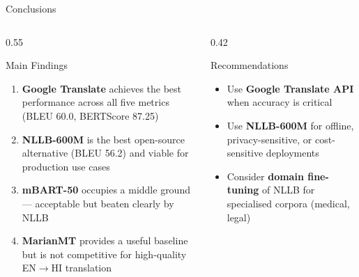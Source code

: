 \documentclass{beamer}
\begin{document}
\begin{frame}{Conclusions}
  \begin{columns}[T]
    \begin{column}{0.55\textwidth}
      \begin{block}{Main Findings}
        \begin{enumerate}
          \item \textbf{Google Translate} achieves the best performance across all five metrics (BLEU 60.0, BERTScore 87.25)
          \item \textbf{NLLB-600M} is the best open-source alternative (BLEU 56.2) and viable for production use cases
          \item \textbf{mBART-50} occupies a middle ground — acceptable but beaten clearly by NLLB
          \item \textbf{MarianMT} provides a useful baseline but is not competitive for high-quality EN$\rightarrow$HI translation 
        \end{enumerate}
      \end{block}
    \end{column}
    \begin{column}{0.42\textwidth}
      \begin{alertblock}{Recommendations}
        \begin{itemize}
          \item Use \textbf{Google Translate API} when accuracy is critical
          \item Use \textbf{NLLB-600M} for offline, privacy-sensitive, or cost-sensitive deployments
          \item Consider \textbf{domain fine-tuning} of NLLB for specialised corpora (medical, legal)
        \end{itemize}
      \end{alertblock}
    \end{column}
  \end{columns}
\end{frame}
\end{document}
